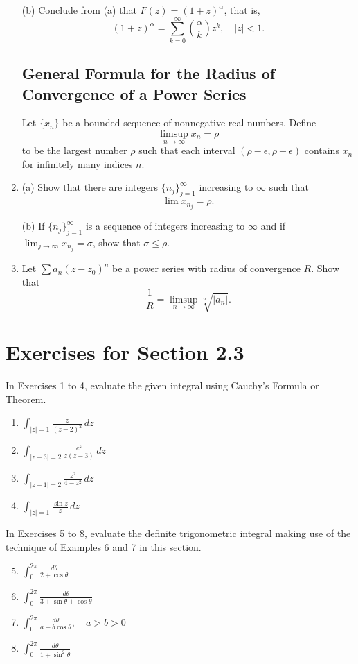 \documentclass[12pt]{article}
\theoremstyle{definition} %
\theoremstyle{plain} %
\begin{document}
\begin{enumerate}
    (b) Conclude from (a) that $F(z) = (1 + z)^\alpha$, that is,
    \[
    (1 + z)^\alpha = \sum_{k=0}^\infty \binom{\alpha}{k} z^k, \quad |z| < 1.
    \]
    
    \subsection*{General Formula for the Radius of Convergence of a Power Series}
    Let $\{x_n\}$ be a bounded sequence of nonnegative real numbers. Define
    \[
    \limsup_{n \to \infty} x_n = \rho
    \]
    to be the largest number $\rho$ such that each interval $(\rho - \epsilon, \rho + \epsilon)$ contains $x_n$ for infinitely many indices $n$.
    
    \item (a) Show that there are integers $\{n_j\}_{j=1}^\infty$ increasing to $\infty$ such that
    \[
    \lim x_{n_j} = \rho.
    \]
    
    (b) If $\{n_j\}_{j=1}^\infty$ is a sequence of integers increasing to $\infty$ and if $\lim_{j \to \infty} x_{n_j} = \sigma$, show that $\sigma \le \rho$.
    
    \item Let $\sum a_n (z - z_0)^n$ be a power series with radius of convergence $R$. Show that
    \[
    \frac{1}{R} = \limsup_{n \to \infty} \sqrt[n]{|a_n|}.
    \]
\end{enumerate}
\section*{Exercises for Section 2.3}

In Exercises 1 to 4, evaluate the given integral using Cauchy’s Formula or Theorem.
\begin{enumerate}
    \item $\int_{|z|=1} \frac{z}{(z - 2)^2} \, dz$
    \item $\int_{|z-3|=2} \frac{e^z}{z(z - 3)} \, dz$
    \item $\int_{|z+1|=2} \frac{z^2}{4 - z^2} \, dz$
    \item $\int_{|z|=1} \frac{\sin z}{z} \, dz$
\end{enumerate}

In Exercises 5 to 8, evaluate the definite trigonometric integral making use of the technique of Examples 6 and 7 in this section.
\begin{enumerate}
    \setcounter{enumi}{4}
    \item $\int_0^{2\pi} \frac{d\theta}{2 + \cos \theta}$
    \item $\int_0^{2\pi} \frac{d\theta}{3 + \sin \theta + \cos \theta}$
    \item $\int_0^{2\pi} \frac{d\theta}{a + b \cos \theta}, \quad a > b > 0$
    \item $\int_0^{2\pi} \frac{d\theta}{1 + \sin^2 \theta}$
\end{enumerate}
\end{document}
